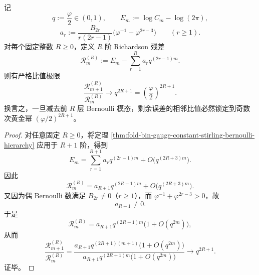 \begin{theorem}\label{thm:xi-time-part70-logcm-richardson-residual-ratio}
记
\[
q:=\frac{\varphi}{2}\in(0,1),
\qquad
E_m:=\log C_m-\log(2\pi),
\]
\[
a_r:=
\frac{B_{2r}}{r(2r-1)}
\bigl(\varphi^{-1}+\varphi^{2r-3}\bigr)
\qquad (r\ge 1).
\]
对每个固定整数 \(R\ge 0\)，定义 \(R\) 阶 Richardson 残差
\[
\mathcal R_m^{(R)}
:=
E_m-\sum_{r=1}^{R}a_r q^{(2r-1)m}.
\]
则有严格比值极限
\[
\frac{\mathcal R_{m+1}^{(R)}}{\mathcal R_m^{(R)}}
\longrightarrow
q^{2R+1}
=
\left(\frac{\varphi}{2}\right)^{2R+1}.
\]
换言之，一旦减去前 \(R\) 层 Bernoulli 模态，剩余误差的相邻比值必然锁定到奇数次黄金幂 \((\varphi/2)^{2R+1}\)。
\end{theorem}
\begin{proof}
对任意固定 \(R\ge 0\)，将定理 \ref{thm:fold-bin-gauge-constant-stirling-bernoulli-hierarchy} 应用于 \(R+1\) 阶，得到
\[
E_m
=
\sum_{r=1}^{R+1}a_r q^{(2r-1)m}
+O\!\bigl(q^{(2R+3)m}\bigr).
\]
因此
\[
\mathcal R_m^{(R)}
=
a_{R+1}q^{(2R+1)m}
+O\!\bigl(q^{(2R+3)m}\bigr).
\]
又因为偶 Bernoulli 数满足 \(B_{2r}\neq 0\)（\(r\ge 1\)），而 \(\varphi^{-1}+\varphi^{2r-3}>0\)，故
\[
a_{R+1}\neq 0.
\]
于是
\[
\mathcal R_m^{(R)}
=
a_{R+1}q^{(2R+1)m}\bigl(1+O(q^{2m})\bigr),
\]
从而
\[
\frac{\mathcal R_{m+1}^{(R)}}{\mathcal R_m^{(R)}}
=
\frac{a_{R+1}q^{(2R+1)(m+1)}\bigl(1+O(q^{2m})\bigr)}
{a_{R+1}q^{(2R+1)m}\bigl(1+O(q^{2m})\bigr)}
\longrightarrow
q^{2R+1}.
\]
证毕。
\end{proof}

